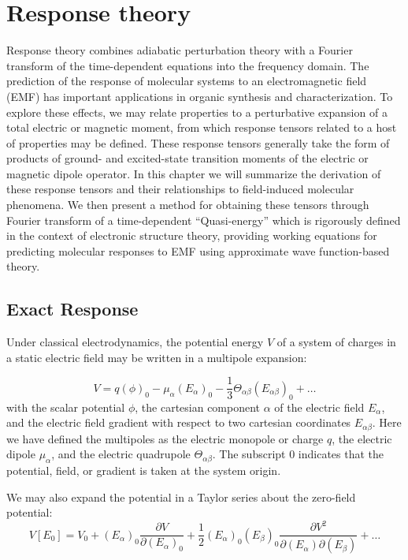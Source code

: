 \section{Response theory} \label{se:res}
Response theory combines adiabatic perturbation theory with a Fourier transform of the 
time-dependent equations into the frequency domain\cite{Pederson2020}. The prediction of the response 
of molecular systems to an electromagnetic field (EMF) has important applications in organic synthesis and
characterization. To explore these effects, we may relate properties to a perturbative expansion of a 
total electric or magnetic moment, from which response tensors related to a host of properties may be defined. 
These response tensors generally take the form of products of ground- and excited-state transition moments of 
the electric or magnetic dipole operator. In this chapter we will summarize the derivation of these 
response tensors and their relationships to field-induced molecular phenomena. We then present a method 
for obtaining these tensors through Fourier transform of a time-dependent ``Quasi-energy'' which is 
rigorously defined in the context of electronic structure theory, providing working equations for 
predicting molecular responses to EMF using approximate wave function-based theory.

\subsection{Exact Response} \label{ss:exact}
Under classical electrodynamics, the potential energy $V$ of a system of charges in a static electric field 
may be written in a multipole expansion:

\begin{equation} \label{eq:pot_V}
V = q(\phi)_0 - \mu_\alpha(E_\alpha)_0 - \frac{1}{3}\Theta_{\alpha\beta}(E_{\alpha\beta})_0 + \ldots
\end{equation}
with the scalar potential $\phi$, the cartesian component $\alpha$ of the electric field $E_\alpha$, and the electric field gradient with respect to two cartesian coordinates $E_{\alpha\beta}$. Here we have defined the multipoles as the electric monopole or charge $q$, the electric dipole $\mu_\alpha$, and the electric quadrupole $\Theta_{\alpha\beta}$. The subscript $0$ indicates that the potential, field, or gradient is taken at the system origin.

We may also expand the potential in a Taylor series about the zero-field potential:
\begin{equation} \label{eq:tay_V}
    V[E_0] = V_0 + (E_\alpha)_0\frac{\partial V}{\partial (E_\alpha)_0} + \frac{1}{2}(E_\alpha)_0(E_\beta)_0\frac{\partial V^2}{\partial (E_\alpha) \partial (E_\beta)} + \ldots
\end{equation}

